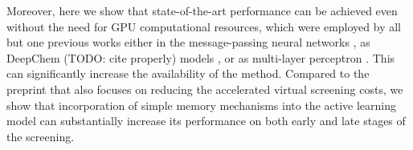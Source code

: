 Moreover, here we show that state-of-the-art performance can be achieved even without the need for GPU computational resources, which were employed by all but one previous works either in the message-passing neural networks \cite{Graff2021AcceleratingLearning}, as DeepChem (TODO: cite properly) models \cite{Yang2021_shoichet_active_learning}, or as multi-layer perceptron \cite{deepdocking}. This can significantly increase the availability of the method. Compared to the preprint \cite{logistic_regression} that also focuses on reducing the accelerated virtual screening costs, we show that incorporation of simple memory mechanisms into the active learning model can substantially increase its performance on both early and late stages of the screening.







